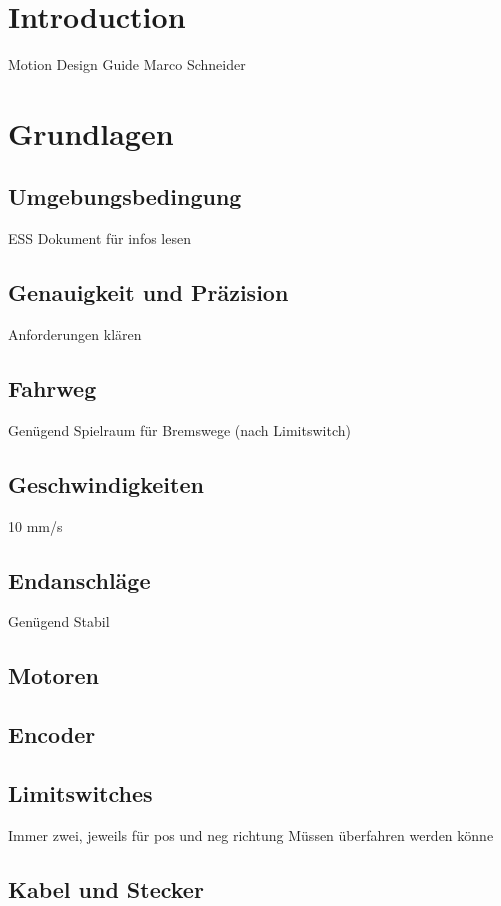 \section{Introduction}

Motion Design Guide
Marco Schneider

\section{Grundlagen}

\subsection{Umgebungsbedingung}
ESS Dokument für infos lesen

\subsection{Genauigkeit und Präzision}
Anforderungen klären

\subsection{Fahrweg}
Genügend Spielraum für Bremswege (nach Limitswitch)

\subsection{Geschwindigkeiten}
10 mm/s

\subsection{Endanschläge}
Genügend Stabil

\subsection{Motoren}

\subsection{Encoder}

\subsection{Limitswitches}
Immer zwei, jeweils für pos und neg richtung
Müssen überfahren werden könne

\subsection{Kabel und Stecker}

